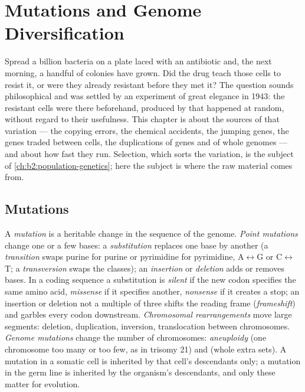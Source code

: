 \chapter{Mutations and Genome Diversification}\label{ch:b2:genome-diversification}

Spread a billion bacteria on a plate laced with an antibiotic and,
the next morning, a handful of colonies have grown. Did the drug
teach those cells to resist it, or were they already resistant
before they met it? The question sounds philosophical and was
settled by an experiment of great elegance in 1943: the resistant
cells were there beforehand, produced by  that happened at
random, without regard to their usefulness. This chapter is about the
sources of that variation --- the copying errors, the chemical
accidents, the jumping genes, the genes traded between cells, the
duplications of genes and of whole genomes --- and about how fast
they run. Selection, which sorts the variation, is the subject of
\cref{ch:b2:population-genetics}; here the subject is where the raw
material comes from.

\section{Mutations}

\begin{definition}\label{def:b2:genome-diversification:mutation}
A \emph{mutation} is a heritable change in the sequence of the
genome. \emph{Point mutations} change one or a few bases: a
\emph{substitution} replaces one base by another (a
\emph{transition} swaps purine for purine or pyrimidine for
pyrimidine, A$\leftrightarrow$G or C$\leftrightarrow$T; a
\emph{transversion} swaps the classes); an \emph{insertion} or
\emph{deletion} adds or removes bases. In a coding sequence a
substitution is \emph{silent} if the new codon specifies the same
amino acid, \emph{missense} if it specifies another, \emph{nonsense}
if it creates a stop; an insertion or deletion not a multiple of
three shifts the reading frame (\emph{frameshift}) and garbles every
codon downstream. \emph{Chromosomal rearrangements} move large
segments: deletion, duplication, inversion, translocation between
chromosomes. \emph{Genome mutations} change the number of
chromosomes: \emph{aneuploidy} (one chromosome too many or too few,
as in trisomy 21) and \emph{} (whole extra sets). A
mutation in a somatic cell is inherited by that cell's descendants
only; a mutation in the germ line is inherited by the organism's
descendants, and only these matter for evolution.
\end{definition}

